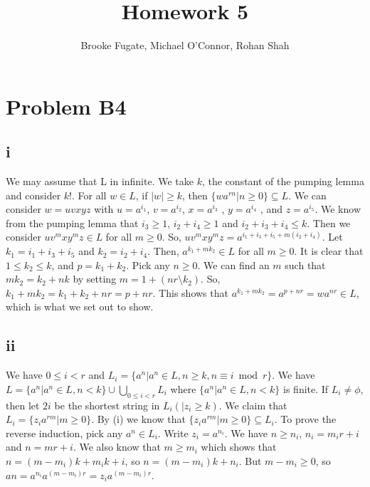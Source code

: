 \documentclass[12pt]{article}
\begin{document}
\pagestyle{plain}
\titleformat{\subsection}[runin]
  {\normalfont\large\bfseries}{\thesubsection}{1em}{}

\title{Homework 5}
\author{Brooke Fugate, Michael O'Connor, Rohan Shah}
\date{}

\maketitle

\section*{Problem B4}
\subsection*{i}
We may assume that L in infinite. We take $k$, the constant of the pumping lemma and consider $k!$. For all $w \in L$, if $|w| \ge k$, then $\{wa^{rn} | n \ge 0 \} \subseteq L$. \newline 
We can consider $w=uvxyz$ with $u=a^{i_1}$, $v=a^{i_2}$, $x=a^{i_3}$ , $y=a^{i_4}$ , and $z=a^{i_5}$. We know from the pumping lemma that $i_3 \ge 1$, $i_2 + i_4 \ge 1$ and $i_2 + i_3 + i_4 \le k$. Then we consider $uv^mxy^mz \in L$ for all $m \ge 0$.  So, $uv^mxy^mz = a^{i_1+i_3+i_5 + m(i_2 + i_4)}$. Let $k_1 = i_1 + i_3 + i_5$ and $k_2 = i_2 + i_4$. Then, $a^{k_1 + mk_2} \in L$ for all $m \ge 0$. It is clear that $1 \le k_2 \le k$, and $p=k_1+k_2$. Pick any $n \ge 0$. We can find an $m$ such that $mk_2=k_2 +nk$ by setting $m=1+(nr\setminus k_2)$. So, $k_1+mk_2=k_1+k_2+nr=p+nr$. This shows that $a^{k_1+mk_2}=a^{p+nr}=wa^{nr} \in L$, which is what we set out to show. 
\subsection*{ii}
We have $0 \le i < r$ and $L_i = \{a^n |a^n \in L, n \ge k , n \equiv i \bmod r \}$. \newline
We have $L = \{ a^n | a^n \in L , n < k\} \cup \bigcup_{0 \le i < r} L_i$ where $\{ a^n | a^n \in L , n < k\}$ is finite. If $L_i \neq \phi$, then let $2i$ be the shortest string in $L_i(|z_i \ge k)$. We claim that $L_i = \{z_i a^{rm} | m \ge 0\}$. By (i) we know that $\{z_i a^{rm} | m \ge 0\} \subseteq L_i$. To prove the reverse induction, pick any $a^n \in L_i$. Write $z_i = a^{n_i}$. We have $n \ge n_i$, $n_i = m_ir + i$ and $n=mr +i$. We also know that $m \ge m_i$ which shows that $n=(m-m_i)k + m_ik + i$, so $n=(m-m_i)k + n_i$. But $m-m_i \ge 0$, so $an=a^{n_i}a^{(m-m_i)r}=z_ia^{(m-m_i)r}$.  
\end{document}

